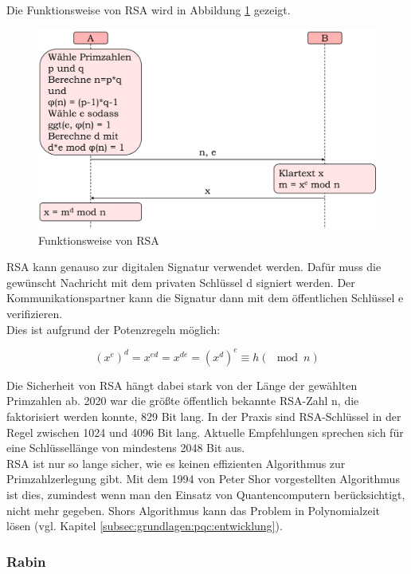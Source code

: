 			Die Funktionsweise von RSA wird in Abbildung \ref{fig:grundlagen:rsa} gezeigt.
			
			\begin{figure}[htbp]
				\centering
				\includegraphics[width=\textwidth]{chapters/abb/grundlagen-rsa}
				\caption{Funktionsweise von RSA}
				\label{fig:grundlagen:rsa}
			\end{figure}
		
			RSA kann genauso zur digitalen Signatur verwendet werden. Dafür muss die gewünscht Nachricht mit dem privaten Schlüssel d signiert werden. Der Kommunikationspartner kann die Signatur dann mit dem öffentlichen Schlüssel e verifizieren.\\
			
			Dies ist aufgrund der Potenzregeln möglich:
			
			\[ (x^{e})^{d} = x^{ed} = x^{de} = (x^{d})^{e} \equiv h (\mod{n}) \]
			
			Die Sicherheit von RSA hängt dabei stark von der Länge der gewählten Primzahlen ab. 2020 war die größte öffentlich bekannte RSA-Zahl n, die faktorisiert werden konnte, 829 Bit lang. In der Praxis sind RSA-Schlüssel in der Regel zwischen 1024 und 4096 Bit lang. Aktuelle Empfehlungen sprechen sich für eine Schlüssellänge von mindestens 2048 Bit aus.\\
			
			RSA ist nur so lange sicher, wie es keinen effizienten Algorithmus zur Primzahlzerlegung gibt. Mit dem 1994 von Peter Shor vorgestellten Algorithmus ist dies, zumindest wenn man den Einsatz von Quantencomputern berücksichtigt, nicht mehr gegeben. Shors Algorithmus kann das Problem in Polynomialzeit lösen (vgl. Kapitel \ref{subsec:grundlagen:pqc:entwicklung}).
			
			\subsubsection{Rabin}
			\label{subsubsec:grundlagen:krypto:auth:rabin}
			
